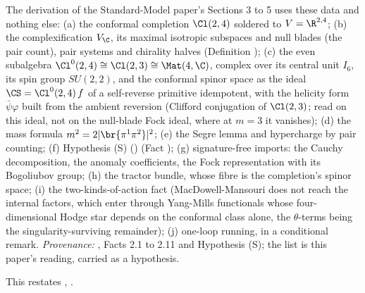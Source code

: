 The derivation of the Standard-Model paper's Sections 3 to 5 uses these data and nothing else: (a) the conformal completion $\Cl(2,4)$ soldered to $V = \R^{2,4}$; (b) the complexification $V_{\C}$, its maximal isotropic subspaces and null blades (the pair count), pair systems and chirality halves (Definition ); (c) the even subalgebra $\Cl^{0}(2,4) \cong \Cl(2,3) \cong \Mat(4,\C)$, complex over its central unit $I_6$, its spin group $SU(2,2)$, and the conformal spinor space as the ideal $\CS = \Cl^{0}(2,4)\,f$ of a self-reverse primitive idempotent, with the helicity form $\bar{\psi}\varphi$ built from the ambient reversion (Clifford conjugation of $\Cl(2,3)$; read on this ideal, not on the null-blade Fock ideal, where at $m = 3$ it vanishes); (d) the mass formula $m^{2} = 2|\br{\pi^{1}\pi^{2}}|^{2}$; (e) the Segre lemma and hypercharge by pair counting; (f) Hypothesis (S) () (Fact ); (g) signature-free imports: the Cauchy decomposition, the anomaly coefficients, the Fock representation with its Bogoliubov group; (h) the tractor bundle, whose fibre is the completion's spinor space; (i) the two-kinds-of-action fact (MacDowell-Mansouri does not reach the internal factors, which enter through Yang-Mills functionals whose four-dimensional Hodge star depends on the conformal class alone, the $\theta$-terms being the singularity-surviving remainder); (j) one-loop running, in a conditional remark. \emph{Provenance:} \cite[\S\S2-5]{ButlerT12}, Facts 2.1 to 2.11 and Hypothesis (S); the list is this paper's reading, carried as a hypothesis.

This restates , .
